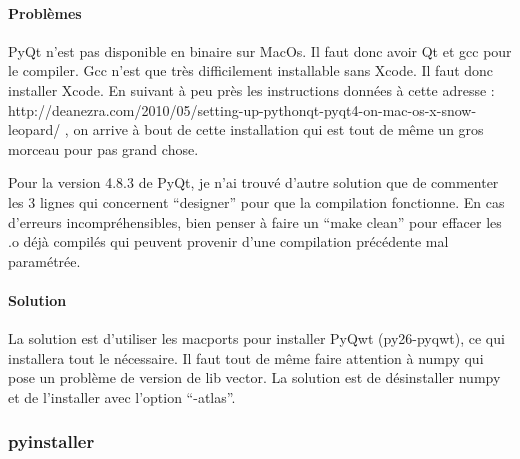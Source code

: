 \documentclass[12pt,a4paper]{article}
\begin{document}
        \paragraph{Problèmes}

        PyQt n'est pas disponible en binaire sur MacOs. Il faut donc avoir Qt et gcc pour le compiler. 
        Gcc n'est que très difficilement installable sans Xcode. Il faut donc installer Xcode.
        En suivant à peu près les instructions données à cette adresse : \newline
        http://deanezra.com/2010/05/setting-up-pythonqt-pyqt4-on-mac-os-x-snow-leopard/\newline
        , on arrive à bout de cette installation qui est tout de même un gros morceau pour pas grand chose.
    
        Pour la version 4.8.3 de PyQt, je n'ai trouvé d'autre solution que de commenter les 3 lignes qui concernent
        ``designer'' pour que la compilation fonctionne. En cas d'erreurs incompréhensibles, bien penser à faire un ``make clean''
        pour effacer les .o déjà compilés qui peuvent provenir d'une compilation précédente mal paramétrée.

        \paragraph{Solution}

        La solution est d'utiliser les macports pour installer PyQwt (py26-pyqwt), ce qui installera tout le n\'ecessaire. Il faut tout de même
        faire attention à numpy qui pose un problème de version de lib vector. La solution est de d\'esinstaller numpy et de l'installer avec l'option
        ``-atlas''. 
        
        \subsubsection{pyinstaller}
\end{document}
